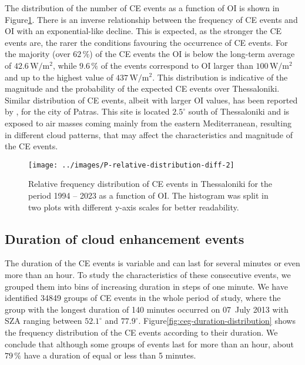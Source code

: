 \documentclass[preprint, 5p,
authoryear]{elsarticle} %
\begin{document}
The distribution of the number of CE events as a function of OI is shown
in Figure\nobreakspace{}\ref{fig:ovir-distribution}. There is an inverse
relationship between the frequency of CE events and OI with an
exponential-like decline. This is expected, as the stronger the CE
events are, the rarer the conditions favouring the occurrence of CE
events. For the majority (over \(62\,\%\)) of the CE events the OI is
below the long-term average of \(42.6\,\text{W}/\text{m}^2\), while
\(9.6\,\%\) of the events correspond to OI larger than
\(100\,\text{W}/\text{m}^2\) and up to the highest value of
\(437\,\text{W}/\text{m}^2\). This distribution is indicative of the
magnitude and the probability of the expected CE events over
Thessaloniki. Similar distribution of CE events, albeit with larger OI
values, has been reported by \citet{Vamvakas2020}, for the city of
Patras. This site is located \(2.5^\circ\) south of Thessaloniki and is
exposed to air masses coming mainly from the eastern Mediterranean,
resulting in different cloud patterns, that may affect the
characteristics and magnitude of the CE events.

\begin{figure}

{\centering \texttt{[image: ../images/P-relative-distribution-diff-2]} 

}

\caption{Relative frequency distribution of CE events in Thessaloniki for the period 1994 -- 2023 as a function of OI. The histogram was split in two plots with different y-axis scales for better readability.}\label{fig:ovir-distribution}
\end{figure}

\hypertarget{duration-of-cloud-enhancement-events}{%
\subsection{Duration of cloud enhancement
events}\label{duration-of-cloud-enhancement-events}}

The duration of the CE events is variable and can last for several
minutes or even more than an hour. To study the characteristics of these
consecutive events, we grouped them into bins of increasing duration in
steps of one minute. We have identified 34849 groups of CE events in the
whole period of study, where the group with the longest duration of 140
minutes occurred on 07~July 2013 with SZA ranging between \(52.1^\circ\)
and \(77.9^\circ\).
Figure\nobreakspace{}\ref{fig:ceg-duration-distribution} shows the
frequency distribution of the CE events according to their duration. We
conclude that although some groups of events last for more than an hour,
about \(79\,\%\) have a duration of equal or less than 5 minutes.
\end{document}
